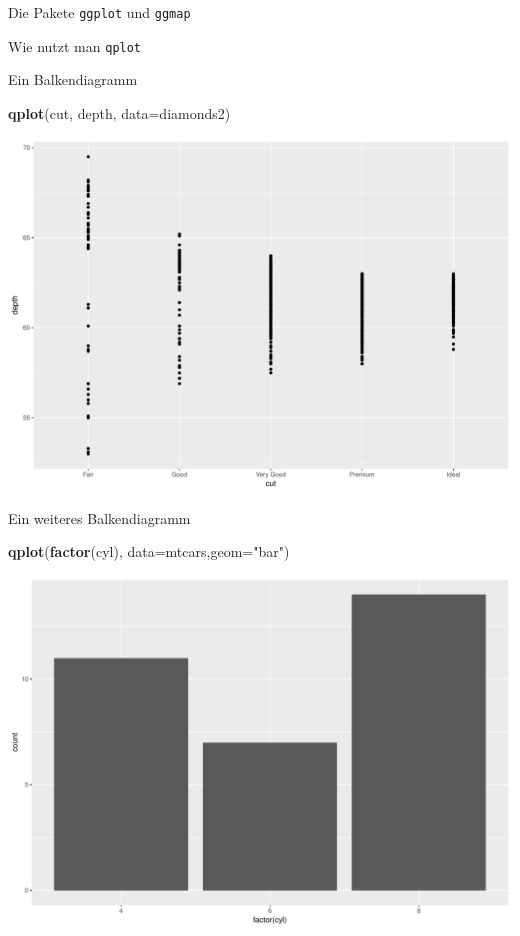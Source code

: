 \documentclass[ignorenonframetext,]{beamer}
\newenvironment{Shaded}{}{}
\newcommand{\KeywordTok}[1]{\textcolor[rgb]{0.00,0.44,0.13}{\textbf{{#1}}}}
\newcommand{\DataTypeTok}[1]{\textcolor[rgb]{0.56,0.13,0.00}{{#1}}}
\newcommand{\StringTok}[1]{\textcolor[rgb]{0.25,0.44,0.63}{{#1}}}
\newcommand{\NormalTok}[1]{{#1}}
\begin{document}
\begin{frame}[fragile]{Die Pakete \texttt{ggplot} und \texttt{ggmap}}
\begin{block}{Wie nutzt man \texttt{qplot}}
\end{block}

\begin{block}{Ein Balkendiagramm}

\begin{Shaded}
\begin{Highlighting}[]
\KeywordTok{qplot}\NormalTok{(cut, depth, }\DataTypeTok{data=}\NormalTok{diamonds2)}
\end{Highlighting}
\end{Shaded}

\includegraphics{R_intern_files/figure-beamer/unnamed-chunk-238-1.pdf}

\end{block}

\begin{block}{Ein weiteres Balkendiagramm}

\begin{Shaded}
\begin{Highlighting}[]
\KeywordTok{qplot}\NormalTok{(}\KeywordTok{factor}\NormalTok{(cyl), }\DataTypeTok{data=}\NormalTok{mtcars,}\DataTypeTok{geom=}\StringTok{"bar"}\NormalTok{)}
\end{Highlighting}
\end{Shaded}

\includegraphics{R_intern_files/figure-beamer/unnamed-chunk-239-1.pdf}


\end{block}
\end{frame}
\end{document}

